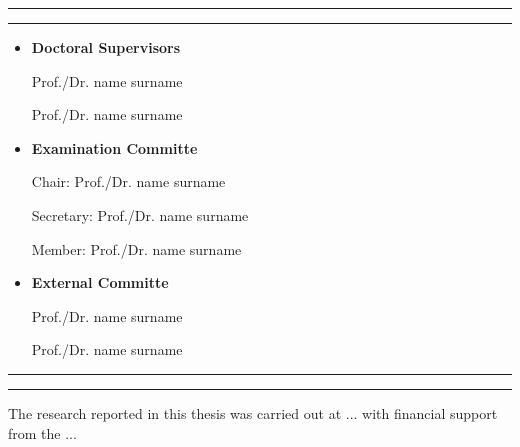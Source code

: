 %
%


\renewcommand{\labelitemi}{\scriptsize$\blacksquare$}

\noindent \rule{0.6\textwidth}{2.0pt}
\vspace{-0.4cm}

\noindent \rule{0.6\textwidth}{0.5pt}

\begin{itemize}
 \item \textbf{Doctoral Supervisors} 
 
 
  \hspace{0.5cm} Prof./Dr. name surname
  
  \hspace{0.5cm} Prof./Dr. name surname\\
  
  \item \textbf{Examination Committe}
  
  \hspace{0.5cm} Chair: Prof./Dr. name surname
  
  \hspace{0.5cm} Secretary:  Prof./Dr. name surname
  
  \hspace{0.5cm} Member: Prof./Dr. name surname\\
  
  
  \item \textbf{External Committe}
  
  \hspace{0.5cm} Prof./Dr. name surname
  
  \hspace{0.5cm} Prof./Dr. name surname
  
\end{itemize}

\noindent \rule{0.6\textwidth}{0.5pt}
\vspace{-0.35cm}

\noindent \rule{0.6\textwidth}{2.0pt}


\vspace{1.5cm}

\noindent The research reported in this thesis was carried out at ...  with financial support from the ... \\

